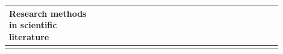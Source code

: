\documentclass[english, 12pt, a4paper, sci, utf8, a-1b, online]{aaltothesis}
\begin{document}
\renewcommand{\arraystretch}{1.5}
\begin{center}
  \begin{longtable}{p{0.3\linewidth}p{0.6\linewidth}}
    \textbf{Research methods in scientific literature}                                                                                                                                                                                                                                                                                                                                                                                                                                                                                                                                                                                                                                                                                                                                                                                                                                                                                                                                                \\
    \hline                                                                                                                                                                                                                                                                                                                                                                                                                                                                                                                                                                                                                                                                                                                                                                                                                                                                                                                                                                                            \\

\end{longtable}
\end{center}
\end{document}
